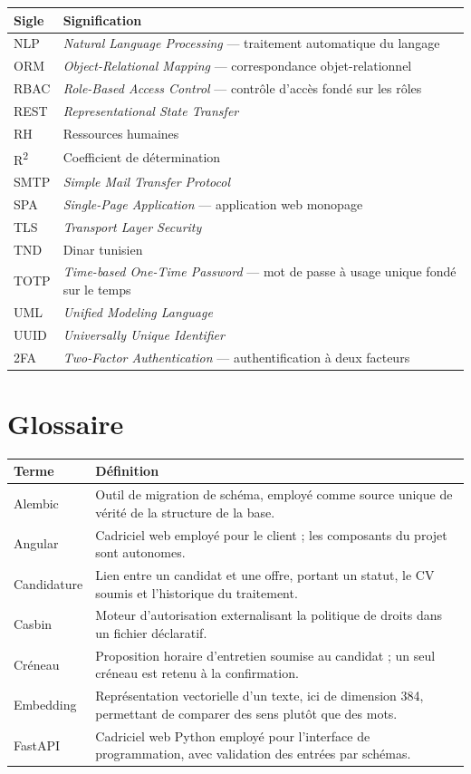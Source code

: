 \medskip
\noindent%
\begin{tabularx}{\textwidth}{L{2.4cm} X}
  \toprule
  \textbf{Sigle} & \textbf{Signification} \\
  \midrule
  NLP   & \emph{Natural Language Processing} — traitement automatique du langage \\
  ORM   & \emph{Object-Relational Mapping} — correspondance objet-relationnel \\
  RBAC  & \emph{Role-Based Access Control} — contrôle d'accès fondé sur les rôles \\
  REST  & \emph{Representational State Transfer} \\
  RH    & Ressources humaines \\
  R\textsuperscript{2} & Coefficient de détermination \\
  SMTP  & \emph{Simple Mail Transfer Protocol} \\
  SPA   & \emph{Single-Page Application} — application web monopage \\
  TLS   & \emph{Transport Layer Security} \\
  TND   & Dinar tunisien \\
  TOTP  & \emph{Time-based One-Time Password} — mot de passe à usage unique fondé sur le temps \\
  UML   & \emph{Unified Modeling Language} \\
  UUID  & \emph{Universally Unique Identifier} \\
  2FA   & \emph{Two-Factor Authentication} — authentification à deux facteurs \\
  \bottomrule
\end{tabularx}

\clearpage
\section*{Glossaire}

\noindent%
\begin{tabularx}{\textwidth}{L{3.4cm} X}
  \toprule
  \textbf{Terme} & \textbf{Définition} \\
  \midrule
  Alembic     & Outil de migration de schéma, employé comme source unique de vérité de la structure de la base. \\
  Angular     & Cadriciel web employé pour le client ; les composants du projet sont autonomes. \\
  Candidature & Lien entre un candidat et une offre, portant un statut, le CV soumis et l'historique du traitement. \\
  Casbin      & Moteur d'autorisation externalisant la politique de droits dans un fichier déclaratif. \\
  Créneau     & Proposition horaire d'entretien soumise au candidat ; un seul créneau est retenu à la confirmation. \\
  Embedding   & Représentation vectorielle d'un texte, ici de dimension 384, permettant de comparer des sens plutôt que des mots. \\
  FastAPI     & Cadriciel web Python employé pour l'interface de programmation, avec validation des entrées par schémas. \\
  \bottomrule
\end{tabularx}


